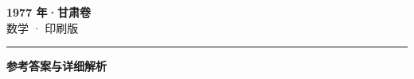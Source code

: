 \documentclass[zihao=5, a4paper]{ctexart}
\begin{document}
\begin{center}
  {\Large\bfseries 1977 年·甘肃卷}\\[4pt]
  {\large 数学 · 印刷版}
\end{center}
\medskip
{}

\par\bigskip\hrule\bigskip
{}
\begin{center}{\large\bfseries 参考答案与详细解析}\end{center}
\smallskip

\end{document}
